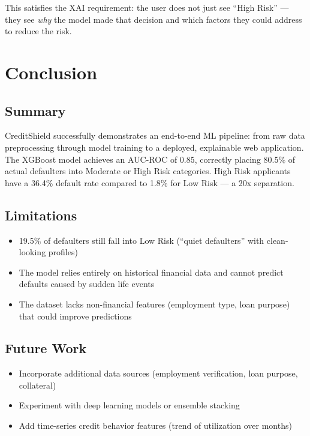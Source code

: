 \documentclass[12pt, a4paper]{article}
\begin{document}
This satisfies the XAI requirement: the user does not just see ``High Risk'' --- they see \textit{why} the model made that decision and which factors they could address to reduce the risk.




\section{Conclusion}

\subsection{Summary}

CreditShield successfully demonstrates an end-to-end ML pipeline: from raw data preprocessing through model training to a deployed, explainable web application. The XGBoost model achieves an AUC-ROC of 0.85, correctly placing 80.5\% of actual defaulters into Moderate or High Risk categories. High Risk applicants have a 36.4\% default rate compared to 1.8\% for Low Risk --- a 20x separation.

\subsection{Limitations}

\begin{itemize}[noitemsep]
    \item 19.5\% of defaulters still fall into Low Risk (``quiet defaulters'' with clean-looking profiles)
    \item The model relies entirely on historical financial data and cannot predict defaults caused by sudden life events
    \item The dataset lacks non-financial features (employment type, loan purpose) that could improve predictions
\end{itemize}

\subsection{Future Work}

\begin{itemize}[noitemsep]
    \item Incorporate additional data sources (employment verification, loan purpose, collateral)
    \item Experiment with deep learning models or ensemble stacking
    \item Add time-series credit behavior features (trend of utilization over months)
\end{itemize}
\end{document}

